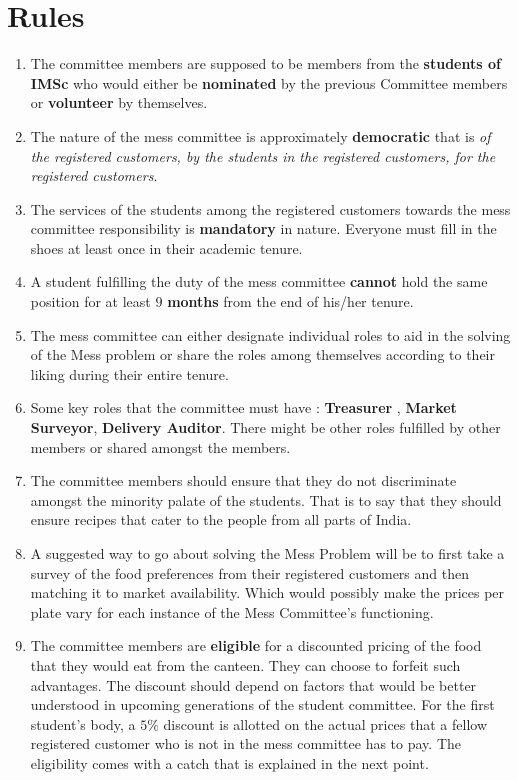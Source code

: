 \documentclass[12pt]{report}
\begin{document}
\section{Rules}
\begin{enumerate}
\item The committee members are supposed to be members from the \textbf{students of IMSc} who would either be \textbf{nominated} by the previous Committee members or \textbf{volunteer} by themselves. 
\item The nature of the mess committee is approximately \textbf{democratic} that is \textit{of the registered customers, by the students in the registered customers, for the registered customers}. 
\item The services of the students among the registered customers towards the mess committee responsibility is \textbf{mandatory} in nature. Everyone must fill in the shoes at least once in their academic tenure.
\item A student fulfilling the duty of the mess committee \textbf{cannot} hold the same position for at least $9$ \textbf{months} from the end of his/her tenure.  
\item The mess committee can either designate individual roles to aid in the solving of the Mess problem or share the roles among themselves according to their liking during their entire tenure.
\item Some key roles that the committee must have : \textbf{Treasurer} , \textbf{Market Surveyor}, \textbf{Delivery Auditor}. There might be other roles fulfilled by other members or shared amongst the members.
\item  The committee members should ensure that they do not discriminate amongst the minority palate of the students. That is to say that they should ensure recipes that cater to the people from all parts of India.
\item A suggested way to go about solving the Mess Problem will be to first take a survey of the food preferences from their registered customers and then matching it to market availability. Which would  possibly make the prices per plate vary for each instance of the Mess Committee's functioning.
\item The committee members are \textbf{eligible} for a discounted pricing of the food that they would eat from the canteen. They can choose to forfeit such advantages. The discount should depend on factors that would be better understood in upcoming generations of the student committee. For the first student's body,   a $5\%$ discount is allotted on the actual prices that a fellow registered customer who is not in the mess committee has to pay. The eligibility comes with a catch that is explained in the next point.

\end{enumerate}
\end{document}

